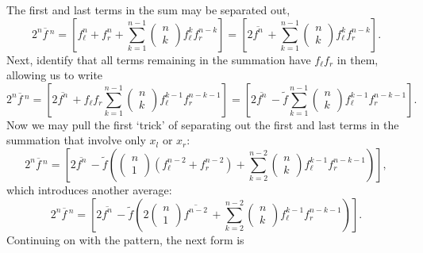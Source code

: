 \documentclass[10pt]{article}
\newcommand{\avg}[1]{\overline{#1}\,}
\newcommand{\invavg}[1]{\widetilde{#1}}
\begin{document}
The first and last terms in the sum may be separated out,
\begin{equation}
	2^n\avg{f}^n = \left[f_\ell^n + f_r^n + \sum_{k=1}^{n-1}\begin{pmatrix}n \\ k\end{pmatrix}f_\ell^kf_r^{n-k}\right] = \left[2\avg{f^n} + \sum_{k=1}^{n-1}\begin{pmatrix}n \\ k\end{pmatrix}f_\ell^kf_r^{n-k}\right].
\end{equation}
Next, identify that all terms remaining in the summation have $f_\ell f_r$ in them, allowing us to write
\begin{equation}
	2^n\avg{f}^n = \left[2\avg{f^n} + f_\ell f_r\sum_{k=1}^{n-1}\begin{pmatrix}n \\ k\end{pmatrix}f_\ell^{k-1}f_r^{n-k-1}\right] = \left[2\avg{f^n} - \invavg{f}\sum_{k=1}^{n-1}\begin{pmatrix}n \\ k\end{pmatrix}f_\ell^{k-1}f_r^{n-k-1}\right].
\end{equation}
Now we may pull the first `trick' of separating out the first and last terms in the summation that involve only $x_l$ or $x_r$:
\begin{equation}
	2^n\avg{f}^n = \left[2\avg{f^n} - \invavg{f}\left(\begin{pmatrix}n \\ 1\end{pmatrix}\left(f_\ell^{n-2}+f_r^{n-2}\right) + \sum_{k=2}^{n-2}\begin{pmatrix}n \\ k\end{pmatrix}f_\ell^{k-1}f_r^{n-k-1}\right)\right],
\end{equation}
which introduces another average:
\begin{equation}
	2^n\avg{f}^n = \left[2\avg{f^n} - \invavg{f}\left(2\begin{pmatrix}n \\ 1\end{pmatrix}\avg{f^{n-2}} + \sum_{k=2}^{n-2}\begin{pmatrix}n \\ k\end{pmatrix}f_\ell^{k-1}f_r^{n-k-1}\right)\right].
\end{equation}
Continuing on with the pattern, the next form is
\end{document}
